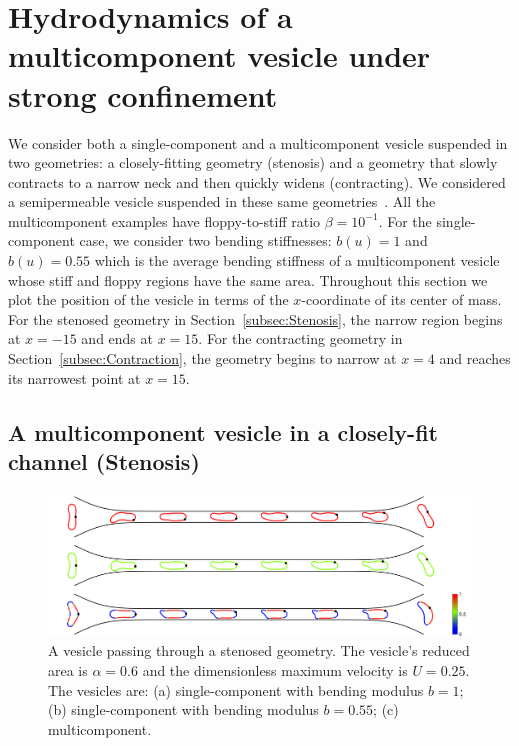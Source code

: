 \documentclass[twoside,twocolumn,9pt]{article}
\newcommand{\subfigimg}[3][,]{%
  \setbox1=\hbox{\texttt{[image: \#3]}}%
  \leavevmode\rlap{\usebox1}%
  \rlap{\hspace*{0pt}\raisebox{\dimexpr\ht1-0\baselineskip}{\bf
  \normalsize #2}}%
  \phantom{\usebox1}%
}
\begin{document}
\section{\label{sec:results}Hydrodynamics of a multicomponent vesicle
under strong confinement}
We consider both a single-component and a multicomponent vesicle
suspended in two geometries: a closely-fitting geometry (stenosis) and a
geometry that slowly contracts to a narrow neck and then quickly widens
(contracting). We considered a semipermeable vesicle suspended in these
same geometries~\cite{qua-gan-you2021}. All the multicomponent examples
have floppy-to-stiff ratio $\beta = 10^{-1}$. For the single-component
case, we consider two bending stiffnesses: $b(u) = 1$ and $b(u) = 0.55$
which is the average bending stiffness of a multicomponent vesicle whose
stiff and floppy regions have the same area. Throughout this section we
plot the position of the vesicle in terms of the $x$-coordinate of its
center of mass. For the stenosed geometry in
Section~\ref{subsec:Stenosis}, the narrow region begins at $x=-15$ and
ends at $x=15$. For the contracting geometry in
Section~\ref{subsec:Contraction}, the geometry begins to narrow at $x=4$
and reaches its narrowest point at $x=15$.





\subsection{\label{subsec:Stenosis}A multicomponent vesicle in a closely-fit channel (Stenosis)}

\begin{figure}[b]
  \centering
  \includegraphics[width=0.9\linewidth]{figures/STENOSIS_RAp6MCp5.pdf}
  \caption{\label{fig:RA6} \small A vesicle passing through a stenosed
  geometry. The vesicle's reduced area is $\alpha = 0.6$ and the
  dimensionless maximum velocity is $U = 0.25$. The vesicles are: (a)
  single-component with bending modulus $b=1$; (b) single-component with
  bending modulus $b=0.55$; (c) multicomponent.}
\end{figure}
\end{document}
